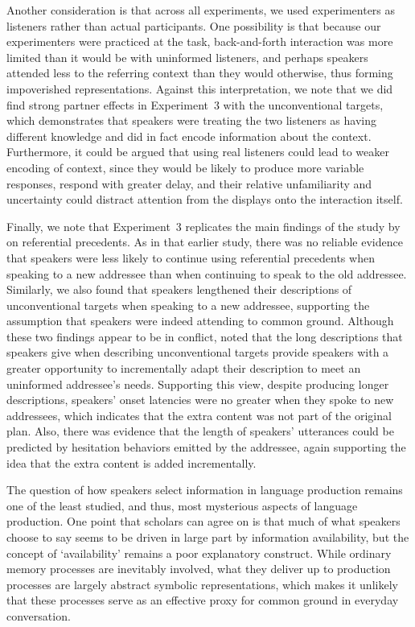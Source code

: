 \documentclass[natbib,doc,a4paper]{apa6}
\begin{document}
Another consideration is that across all experiments, we used experimenters as listeners rather than actual participants. One possibility is that because our experimenters were practiced at the task, back-and-forth interaction was more limited than it would be with uninformed listeners, and perhaps speakers attended less to the referring context than they would otherwise, thus forming impoverished representations. Against this interpretation, we note that we did find strong partner effects in Experiment~3 with the unconventional targets, which demonstrates that speakers were treating the two listeners as having different knowledge and did in fact encode information about the context. Furthermore, it could be argued that using real listeners could lead to weaker encoding of context, since they would be likely to produce more variable responses, respond with greater delay, and their relative unfamiliarity and uncertainty could distract attention from the displays onto the interaction itself.

Finally, we note that Experiment~3 replicates the main findings of the study by \cite{GannBarr2014} on referential precedents. As in that earlier study, there was no reliable evidence that speakers were less likely to continue using referential precedents when speaking to a new addressee than when continuing to speak to the old addressee. Similarly, we also found that speakers lengthened their descriptions of unconventional targets when speaking to a new addressee, supporting the assumption that speakers were indeed attending to common ground. Although these two findings appear to be in conflict, \cite{GannBarr2014} noted that the long descriptions that speakers give when describing unconventional targets provide speakers with a greater opportunity to incrementally adapt their description to meet an uninformed addressee's needs. Supporting this view, despite producing longer descriptions, speakers' onset latencies were no greater when they spoke to new addressees, which indicates that the extra content was not part of the original plan. Also, there was evidence that the length of speakers' utterances could be predicted by hesitation behaviors emitted by the addressee, again supporting the idea that the extra content is added incrementally.

The question of how speakers select information in language production remains one of the least studied, and thus, most mysterious aspects of language production. One point that scholars can agree on is that much of what speakers choose to say seems to be driven in large part by information availability, but the concept of `availability' remains a poor explanatory construct. While ordinary memory processes are inevitably involved, what they deliver up to production processes are largely abstract symbolic representations, which makes it unlikely that these processes serve as an effective proxy for common ground in everyday conversation.


\end{document}
